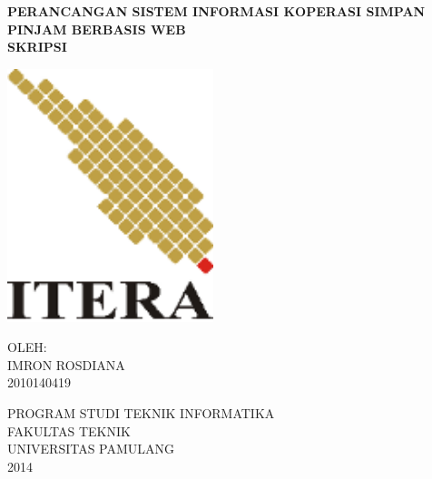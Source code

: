 \begin{titlepage}
\begin{center}
	\onehalfspacing
	\large \bfseries PERANCANGAN SISTEM INFORMASI KOPERASI SIMPAN PINJAM BERBASIS WEB \\
	\vspace{1cm}
	 \large SKRIPSI \\
	
	\vspace{2cm}
	
	\includegraphics[width=6cm]{images/logo-itera.png}
	
	\vspace{1cm}
	\large OLEH: \\
	IMRON ROSDIANA \\
	2010140419
	
	\vspace{3cm}
	
	\normalsize PROGRAM STUDI TEKNIK INFORMATIKA \\
	\large FAKULTAS TEKNIK \\
	UNIVERSITAS PAMULANG \\
	2014
	

	
\end{center}

\end{titlepage}

\newpage